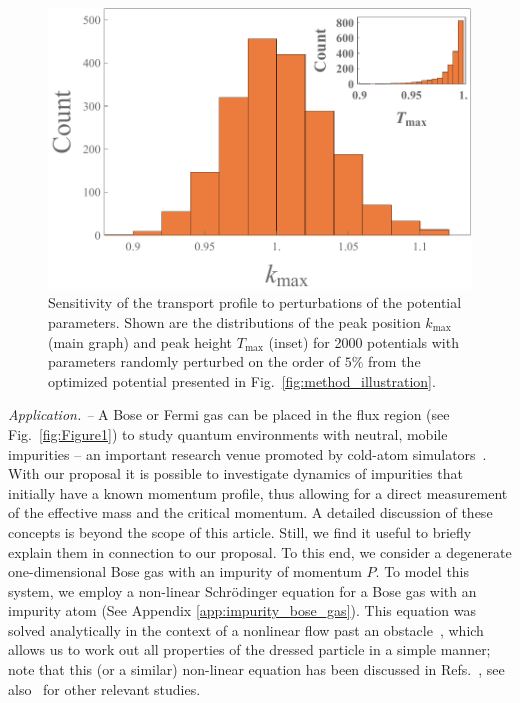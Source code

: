 \documentclass[reprint, twocolumn,amsmath,amssymb,showpacs,pra,superscriptaddress,aps]{revtex4-1}
\begin{document}
\begin{figure}
   \includegraphics[width=1\linewidth]{plot_sensitivity.pdf}
 \caption[Sensitivity Plot]{Sensitivity of the transport profile to perturbations of the potential parameters. Shown are the distributions of the peak position $k_{\mathrm{max}}$ (main graph) and peak height $T_{\mathrm{max}}$ (inset) for 2000 potentials with parameters randomly perturbed on the order of $5\%$ from the optimized potential presented in Fig.~\ref{fig:method_illustration}.}
 \label{fig:sensitivity}
\end{figure}



{\it Application. --} A Bose or Fermi gas can be placed in the flux region  (see Fig.~\ref{fig:Figure1}) to study quantum environments with neutral, mobile impurities -- an important research venue promoted by cold-atom simulators~\cite{zwierlein2009,salomon2009,grimm2012, widera2012, catani2012, fukuhara2013, hu2016,arlt2016,zaccanti2017,ardila2018}. With our proposal it is possible to investigate dynamics of impurities that initially have a known momentum profile, thus allowing for a direct measurement of the effective mass and the critical momentum. A detailed discussion of these concepts is beyond the scope of this article. Still, we find it useful to briefly explain them in connection to our proposal. To this end, we consider a degenerate one-dimensional Bose gas with an impurity of momentum $P$. To model this system, we employ a non-linear Schr{\"o}dinger equation for a Bose gas with an impurity atom (See Appendix \ref{app:impurity_bose_gas}). This equation was solved analytically in the context of a nonlinear flow past an obstacle~\cite{hakim1997}, which allows us to work out all properties of the dressed particle in a simple manner; note that this (or a similar) non-linear equation has been discussed in Refs.~\cite{kamenev2016, volosniev2017, mistakidis2018, dehkharghani2018, pastukhov2018,pastukhov2019}, see also~\cite{sacha2006, catani2012, kain2016, parisi2017,grusdt2017, pastukhov2017, kain2018} for other relevant studies. 
\end{document}

